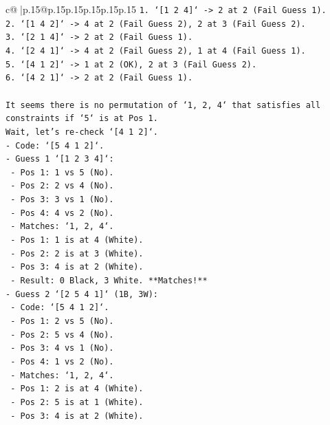 \documentclass{article}
\begin{document}
{\begin{supertabular}{c@{$\;$}|p{.15\linewidth}@{}p{.15\linewidth}p{.15\linewidth}p{.15\linewidth}p{.15\linewidth}p{.15\linewidth}}
{{{\texttt{1. `{[}1 2 4{]}` {-}> 2 at 2 (Fail Guess 1).} \\
\texttt{2. `{[}1 4 2{]}` {-}> 4 at 2 (Fail Guess 2), 2 at 3 (Fail Guess 2).} \\
\texttt{3. `{[}2 1 4{]}` {-}> 2 at 2 (Fail Guess 1).} \\
\texttt{4. `{[}2 4 1{]}` {-}> 4 at 2 (Fail Guess 2), 1 at 4 (Fail Guess 1).} \\
\texttt{5. `{[}4 1 2{]}` {-}> 1 at 2 (OK), 2 at 3 (Fail Guess 2).} \\
\texttt{6. `{[}4 2 1{]}` {-}> 2 at 2 (Fail Guess 1).} \\
\\ 
\texttt{It seems there is no permutation of `1, 2, 4` that satisfies all constraints if `5` is at Pos 1.} \\
\texttt{Wait, let's re{-}check `{[}4 1 2{]}`.} \\
\texttt{{-} Code: `{[}5 4 1 2{]}`.} \\
\texttt{{-} Guess 1 `{[}1 2 3 4{]}`:} \\
\texttt{    {-} Pos 1: 1 vs 5 (No).} \\
\texttt{    {-} Pos 2: 2 vs 4 (No).} \\
\texttt{    {-} Pos 3: 3 vs 1 (No).} \\
\texttt{    {-} Pos 4: 4 vs 2 (No).} \\
\texttt{    {-} Matches: `1, 2, 4`.} \\
\texttt{    {-} Pos 1: 1 is at 4 (White).} \\
\texttt{    {-} Pos 2: 2 is at 3 (White).} \\
\texttt{    {-} Pos 3: 4 is at 2 (White).} \\
\texttt{    {-} Result: 0 Black, 3 White. **Matches!**} \\
\texttt{{-} Guess 2 `{[}2 5 4 1{]}` (1B, 3W):} \\
\texttt{    {-} Code: `{[}5 4 1 2{]}`.} \\
\texttt{    {-} Pos 1: 2 vs 5 (No).} \\
\texttt{    {-} Pos 2: 5 vs 4 (No).} \\
\texttt{    {-} Pos 3: 4 vs 1 (No).} \\
\texttt{    {-} Pos 4: 1 vs 2 (No).} \\
\texttt{    {-} Matches: `1, 2, 4`.} \\
\texttt{    {-} Pos 1: 2 is at 4 (White).} \\
\texttt{    {-} Pos 2: 5 is at 1 (White).} \\
\texttt{    {-} Pos 3: 4 is at 2 (White).} \\
}}}
\end{supertabular}}
\end{document}
